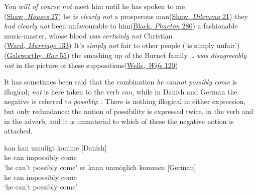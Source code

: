 \ea \label{ex:05-49}
\ea
You \textit{will of course not} meet him until he has spoken to me\\\hfill(\href{https://archive.org/details/widowershousesun00shaw/page/28/mode/2up?q=%22you+will+of+course%22&view=theater}{Shaw, \textit{Houses} 27})
\ex
he \textit{is clearly not} a prosperous man\hfill(\href{https://archive.org/details/doctorsdilemmatr00shawuoft/page/20/mode/2up?q=%22prosperous+man%22&view=theater}{Shaw, \textit{Dilemma} 21})
\ex
they \textit{had clearly not} been unfavourable to him\hfill(\href{https://archive.org/details/strangeadventure00blac/page/268/mode/2up?view=theater&q=%22unfavorable+to+him%22}{Black, \textit{Phaeton} 280}) %
\ex
a fashionable music-master, whose blood \textit{was certainly not} Christian\\\hfill(\href{https://archive.org/details/marriageofwillia0000mrsh_i0u5/page/154/mode/2up?q=%22whose+blood+was%22&view=theater}{Ward, \textit{Marriage} 133}) %
\ex
It'\textit{s simply not} fair to other people \phantom{x} (`is simply unfair')\\\hfill(\href{https://archive.org/details/silverboxcomedyi00gals/page/54/mode/2up?q=%22simply+not+fair+to+other+people%22&view=theater}{Galsworthy, \textit{Box} 55})
\ex
the smashing up of the Burnet family {\dots} \textit{was disagreeably not} in the picture of these suppositions\hfill(\href{https://archive.org/details/wifeofsirisaacha00well/page/120/mode/2up?view=theater&q=%22smashing+up+of%22}{Wells, \textit{Wife} 120}) %
\z
\z

It has sometimes been said that the combination \textit{he cannot possibly come} is illogical; \textit{not} is here taken to the verb \textit{can}, while in Danish and German the negative is referred to \textit{possibly}: . There is nothing illogical in either expression, but only redundance: %
the notion of possibility is expressed twice, in the verb and in the adverb, and it is immaterial to which of these the negative notion is attached.

\ea \label{ex:05-55}
\ea
\gll han kan umuligt komme [Danish]\\
 he can impossibly come\\
\glt `he can't possibly come'
\ex
\gll er kann unmöglich kommen [German]\\
 he can impossibly come\\
\glt `he can't possibly come'
\z
\z

